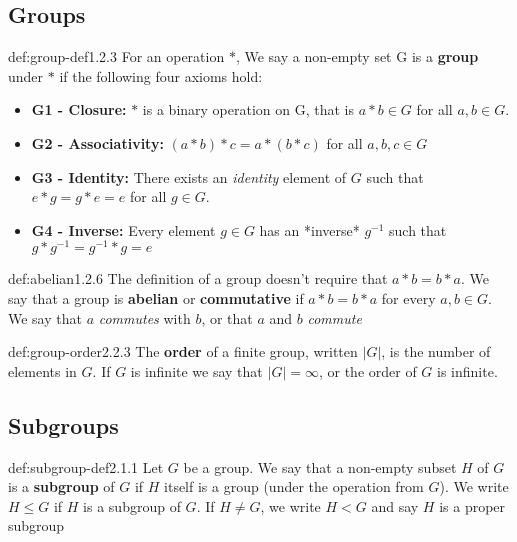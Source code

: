 \documentclass[8pt]{extarticle}
\begin{document}
\begin{multicols}{2}
\subsection{Groups}

\begin{dfn}[Groups]{def:group-def}{1.2.3}
    For an operation $\ast$, We say a non-empty set G is a \textbf{group} under $\ast$ if the following four axioms hold:
    \renewcommand\labelitemi{\tiny$\bullet$}
    \begin{itemize}
        \setlength\itemsep{0em}
        \item \textbf{G1 - Closure:} $\ast$ is a binary operation on G, that is $a\ast b \in G$ for all $a,b\in G$.
        \item \textbf{G2 - Associativity:} $(a\ast b) \ast c =a\ast(b\ast c)$ for all $a,b,c\in G$
        \item \textbf{G3 - Identity:} There exists an \textit{identity} element of $G$ such that $e\ast g = g\ast e = e$ for all $g\in G$.
        \item \textbf{G4 - Inverse:} Every element $g\in G$ has an *inverse* $g^{-1}$ such that $g\ast g^{-1}=g^{-1}\ast g = e$
    \end{itemize}
\end{dfn}

\begin{dfn}{def:abelian}{1.2.6}
    The definition of a group doesn't require that $a\ast b = b\ast a$.
    We say that a group is \textbf{abelian} or \textbf{commutative} if $a\ast b = b\ast a$ for every $a,b\in G$. We say that $a$ \textit{commutes} with $b$, or that $a$ and $b$ \textit{commute}
\end{dfn}

\begin{dfn}{def:group-order}{2.2.3}
    The \textbf{order} of a finite group, written $\lvert G \rvert$, is the number of elements in $G$.
    If $G$ is infinite we say that $\lvert G \rvert = \infty$, or the order of $G$ is infinite.
\end{dfn}

\subsection{Subgroups}

\begin{dfn}[Subgroups]{def:subgroup-def}{2.1.1}
    Let $G$ be a group. We say that a non-empty subset $H$ of $G$ is a \textbf{subgroup} of $G$ if $H$ itself is a group (under the operation from $G$). We write $H\le G$ if $H$ is a subgroup of $G$. If $H\ne G$, we write $H<G$ and say $H$ is a proper subgroup
\end{dfn}


\end{multicols}
\end{document}
